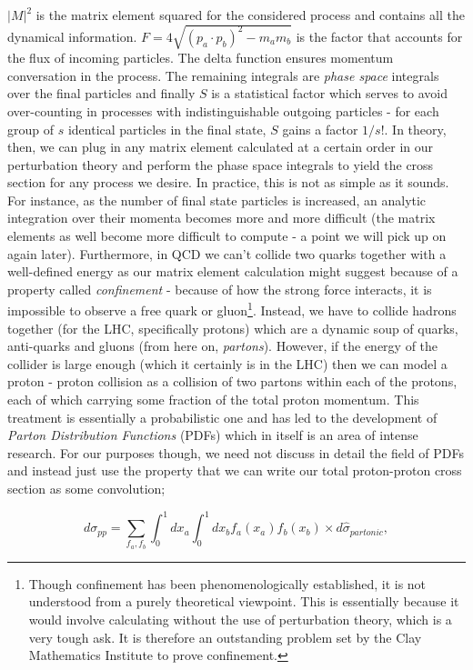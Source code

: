 $|M|^2$ is the matrix element squared for the considered process and contains all the dynamical information. $F = 4 \sqrt{(p_a \cdot p_b)^2 - m_a m_b}$  is the factor that accounts for the flux of incoming particles. The delta function ensures momentum conversation in the process. The remaining integrals are \emph{phase space} integrals over the final particles and finally $S$ is a statistical factor which serves to avoid over-counting in processes with indistinguishable outgoing particles - for each group of $s$ identical particles in the final state, $S$ gains a factor $1/s!$. In theory, then, we can plug in any matrix element calculated at a certain order in our perturbation theory and perform the phase space integrals to yield the cross section for any process we desire. In practice, this is not as simple as it sounds. For instance, as the number of final state particles is increased, an analytic integration over their momenta becomes more and more difficult (the matrix elements as well become more difficult to compute - a point we will pick up on again later). Furthermore, in QCD we can't collide two quarks together with a well-defined energy as our matrix element calculation might suggest because of a property called \emph{confinement} - because of how the strong force interacts, it is impossible to observe a free quark or gluon\footnote{Though confinement has been phenomenologically established, it is not understood from a purely theoretical viewpoint. This is essentially because it would involve calculating without the use of perturbation theory, which is a very tough ask. It is therefore an outstanding problem set by the Clay Mathematics Institute to prove confinement.}. Instead, we have to collide hadrons together (for the LHC, specifically protons) which are a dynamic soup of quarks, anti-quarks and gluons (from here on, \emph{partons}). However, if the energy of the collider is large enough (which it certainly is in the LHC) then we can model a proton - proton collision as a collision of two partons within each of the protons, each of which carrying some fraction of the total proton momentum. This treatment is essentially a probabilistic one and has led to the development of \emph{Parton Distribution Functions} (PDFs) \cite{Soper1997} which in itself is an area of intense research. For our purposes though, we need not discuss in detail the field of PDFs and instead just use the property that we can write our total proton-proton cross section as some convolution;

\begin{equation}
d \sigma_{pp} = \sum_{f_a, f_b} \int_0^1 dx_a \int_0^1 dx_b f_a(x_a) f_b(x_b) \times d\hat{\sigma}_{partonic},
\end{equation}

